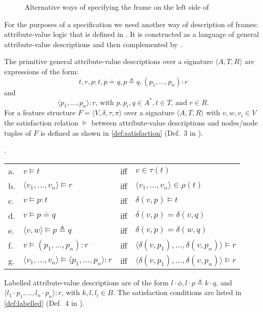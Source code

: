 \begin{figure}
%
\caption{Alternative ways of specifying the frame on the left side of
\label{fig-frame-example-II}}
\end{figure}

For the purposes of a  specification we need another way of description of frames: attribute-value logic that is defined in \citealt[Section~3.3.2]{KallmeyerOsswald:13}. It is constructed as a language of general attribute-value descriptions and then complemented by .\pagebreak

The primitive general attribute-value descriptions over a signature $\langle A, T, R \rangle$ are expressions of the form: \[t, r, p : t, p \doteq q, p \triangleq q, (p_1, \ldots , p_n) : r\] and \[\langle p_1, \ldots , p_n \rangle : r \text{, with } p, p_i, q \in A^*, t \in T \text{, and }r \in R\text{.}\] For a feature structure $F = \langle V, \delta, \tau, \pi \rangle$ over a signature $\langle A, T, R \rangle$ with $v,w, v_i \in V$ the satisfaction relation $\models$ between attribute-value descriptions and nodes/node tuples of $F$ is defined as shown in \ref{def:satisfaction} (Def.~3 in \citealt{KallmeyerOsswald:13}).

\ex.\label{def:satisfaction}
\begin{tabular}[t]{@{}llll@{}}
a. & $v \models t$   & iff &  $v \in \tau (t)$\\
b. & $\langle v_1, \ldots , v_n \rangle \models r$   & iff &  $\langle v_1, \ldots , v_n \rangle \in \rho (t)$\\
c. & $v \models p : t$   & iff &  $\delta (v, p) \models t$\\
d. & $v \models p \doteq q$   & iff &  $\delta (v, p) = \delta (v, q)$\\
e. & $\langle v, w \rangle \models p \triangleq q$   & iff &  $\delta (v, p) = \delta (w, q)$\\
f. & $v \models (p_1, \ldots , p_n ) : r$   & iff &  $\langle \delta (v, p_1), \ldots , \delta (v, p_n) \rangle \models r$\\
g. & $\langle v_1, \ldots , v_n \rangle \models \langle p_1, \ldots , p_n \rangle : r$   & iff &  $\langle \delta (v, p_1), \ldots , \delta (v, p_n) \rangle \models r$
\end{tabular}

Labelled attribute-value descriptions are of the form $l \cdot \phi, l \cdot p \triangleq k \cdot q$, and $\langle l_1 \cdot p_1, \ldots , l_n \cdot p_n \rangle : r$, with $k, l, l_i \in B$. The satisfaction conditions are listed in \ref{def:labelled} (Def.~4 in \citealt{KallmeyerOsswald:13}).

